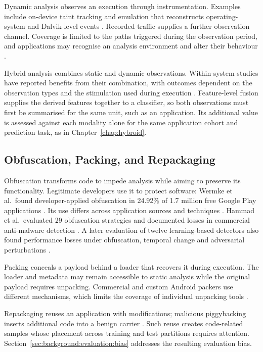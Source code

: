 Dynamic analysis observes an execution through instrumentation. Examples include on-device
taint tracking \cite{enck2014taintdroid} and emulation that reconstructs operating-system and
Dalvik-level events \cite{yan2012droidscope}. Recorded traffic supplies a further observation
channel. Coverage is limited to the paths triggered during the observation period, and
applications may recognise an analysis environment and alter their behaviour
\cite{petsas2014rage,vidas2014evading}.

Hybrid analysis combines static and dynamic observations. Within-system studies have reported
benefits from their combination, with outcomes dependent on the observation types and the
stimulation used during execution \cite{lindorfer2015marvin,onwuzurike2018family}.
Feature-level fusion supplies the derived features together to a classifier, so both
observations must first be summarised for the same unit, such as an application. Its additional
value is assessed against each modality alone for the same application cohort and prediction
task, as in Chapter~\ref{chap:hybroid}.

\subsection{Obfuscation, Packing, and Repackaging}
\label{sec:background:android:obfuscation}

Obfuscation transforms code to impede analysis while aiming to preserve its functionality.
Legitimate developers use it to protect software: Wermke et al.\ found developer-applied
obfuscation in 24.92\% of 1.7 million free Google Play applications
\cite{wermke2018large}. Its use differs across application sources and techniques
\cite{dong2018understanding}. Hammad et al.\ evaluated 29 obfuscation strategies and documented
losses in commercial anti-malware detection \cite{hammad2018large}. A later evaluation of
twelve learning-based detectors also found performance losses under obfuscation, temporal
change and adversarial perturbations \cite{gao2024comprehensive}.

Packing conceals a payload behind a loader that recovers it during execution. The loader and
metadata may remain accessible to static analysis while the original payload requires
unpacking. Commercial and custom Android packers use different mechanisms, which limits the
coverage of individual unpacking tools \cite{duan2018things}.

Repackaging reuses an application with modifications; malicious piggybacking inserts additional
code into a benign carrier \cite{li2017understanding}. Such reuse creates code-related
samples whose placement across training and test partitions requires attention.
Section~\ref{sec:background:evaluation:bias} addresses the resulting evaluation bias.

